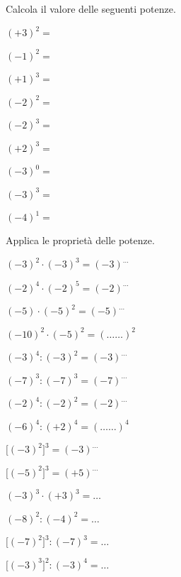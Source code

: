 \begin{esercizio}
\label{ese:2.22}
Calcola il valore delle seguenti potenze.

\vspace{-1em}
\begin{htmulticols}{3}
 \begin{enumeratees}
 \item \((+3)^2 =\)
 \item \((-1)^2 =\)
 \item \((+1)^3 =\)
 \item \((-2)^2 =\)
 \item \((-2)^3 =\)
 \item \((+2)^3 =\)
 \item \((-3)^0 =\)
 \item \((-3)^3 =\)
 \item \((-4)^1 =\)
 \end{enumeratees}
 \end{htmulticols}
\end{esercizio}

\begin{esercizio}
\label{ese:2.23}
 Applica le proprietà delle potenze.
 
\vspace{-1em}
\begin{htmulticols}{2}
 \begin{enumeratees}
 \item \((-3)^2\cdot(-3)^3 = (-3)^{\ldots}\)
 \item \((-2)^4\cdot(-2)^5 = (-2)^{\ldots}\)
 \item \((-5)\cdot(-5)^2 = (-5)^{\ldots}\)
 \item \((-10)^2\cdot(-5)^2 = (\ldots \ldots)^2\)
 \item \((-3)^4:(-3)^2 = (-3)^{\ldots}\)
 \item \((-7)^3:(-7)^3=(-7)^{\ldots}\)
 \item \((-2)^4:(-2)^2=(-2)^{\ldots}\)
 \item \((-6)^4:(+2)^4=(\ldots \ldots)^4\)
 \item \(\big[(-3)^2\big]^3 = (-3)^{\ldots}\)
 \item \(\big[(-5)^2\big]^3=(+5)^{\ldots}\)
 \item \((-3)^3\cdot(+3)^3 = \ldots\)
 \item \((-8)^2:(-4)^2= \ldots\)
 \item \(\big[(-7)^2\big]^3: (-7)^3 =\ldots\)
 \item \(\big[(-3)^3\big]^2: (-3)^4=\ldots\)
 \end{enumeratees}
 \end{htmulticols}
\end{esercizio}

